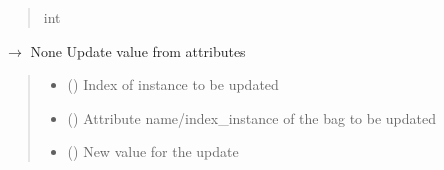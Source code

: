 \documentclass[letterpaper,10pt,english]{sphinxmanual}
\begin{document}
\begin{fulllineitems}
\begin{fulllineitems}
\begin{quote}
\begin{description}
\sphinxAtStartPar
int

\end{description}\end{quote}

\end{fulllineitems}


\begin{fulllineitems}
\label{\detokenize{data/_autosummary/miml.data.bag.Bag:miml.data.bag.Bag.set_attribute}}
\pysigstartsignatures
\pysiglinewithargsret
{}
{\sphinxparamcomma {}\sphinxparamcomma {}}
{{ $\rightarrow$ None}}
\pysigstopsignatures
\sphinxAtStartPar
Update value from attributes
\begin{quote}\begin{description}
\begin{itemize}
\item {} 
\sphinxAtStartPar
{} () \textendash{} Index of instance to be updated

\item {} 
\sphinxAtStartPar
{} () \textendash{} Attribute name/index\_instance of the bag to be updated

\item {} 
\sphinxAtStartPar
{} () \textendash{} New value for the update

\end{itemize}

\end{description}\end{quote}

\end{fulllineitems}



\end{fulllineitems}
\end{document}
